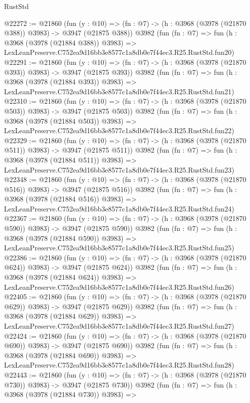 \begin{lexlean}{RustStd}
\begin{coremodule}
@22272 := @21860
    (fun (y : @10) => (fn : @7) -> (h : @3968 (@3978 (@21870 @388)) @3983) -> @3947 (@21875 @388))
    @3982
    (fun (fn : @7) =>
    fun (h : @3968 (@3978 (@21884 @388)) @3983) =>
    LexLeanPreserve.C752ea9d16bb3e8577c1a8db0e7f44ec3.R25.RustStd.fun20)
@22291 := @21860
    (fun (y : @10) => (fn : @7) -> (h : @3968 (@3978 (@21870 @393)) @3983) -> @3947 (@21875 @393))
    @3982
    (fun (fn : @7) =>
    fun (h : @3968 (@3978 (@21884 @393)) @3983) =>
    LexLeanPreserve.C752ea9d16bb3e8577c1a8db0e7f44ec3.R25.RustStd.fun21)
@22310 := @21860
    (fun (y : @10) => (fn : @7) -> (h : @3968 (@3978 (@21870 @503)) @3983) -> @3947 (@21875 @503))
    @3982
    (fun (fn : @7) =>
    fun (h : @3968 (@3978 (@21884 @503)) @3983) =>
    LexLeanPreserve.C752ea9d16bb3e8577c1a8db0e7f44ec3.R25.RustStd.fun22)
@22329 := @21860
    (fun (y : @10) => (fn : @7) -> (h : @3968 (@3978 (@21870 @511)) @3983) -> @3947 (@21875 @511))
    @3982
    (fun (fn : @7) =>
    fun (h : @3968 (@3978 (@21884 @511)) @3983) =>
    LexLeanPreserve.C752ea9d16bb3e8577c1a8db0e7f44ec3.R25.RustStd.fun23)
@22348 := @21860
    (fun (y : @10) => (fn : @7) -> (h : @3968 (@3978 (@21870 @516)) @3983) -> @3947 (@21875 @516))
    @3982
    (fun (fn : @7) =>
    fun (h : @3968 (@3978 (@21884 @516)) @3983) =>
    LexLeanPreserve.C752ea9d16bb3e8577c1a8db0e7f44ec3.R25.RustStd.fun24)
@22367 := @21860
    (fun (y : @10) => (fn : @7) -> (h : @3968 (@3978 (@21870 @590)) @3983) -> @3947 (@21875 @590))
    @3982
    (fun (fn : @7) =>
    fun (h : @3968 (@3978 (@21884 @590)) @3983) =>
    LexLeanPreserve.C752ea9d16bb3e8577c1a8db0e7f44ec3.R25.RustStd.fun25)
@22386 := @21860
    (fun (y : @10) => (fn : @7) -> (h : @3968 (@3978 (@21870 @624)) @3983) -> @3947 (@21875 @624))
    @3982
    (fun (fn : @7) =>
    fun (h : @3968 (@3978 (@21884 @624)) @3983) =>
    LexLeanPreserve.C752ea9d16bb3e8577c1a8db0e7f44ec3.R25.RustStd.fun26)
@22405 := @21860
    (fun (y : @10) => (fn : @7) -> (h : @3968 (@3978 (@21870 @629)) @3983) -> @3947 (@21875 @629))
    @3982
    (fun (fn : @7) =>
    fun (h : @3968 (@3978 (@21884 @629)) @3983) =>
    LexLeanPreserve.C752ea9d16bb3e8577c1a8db0e7f44ec3.R25.RustStd.fun27)
@22424 := @21860
    (fun (y : @10) => (fn : @7) -> (h : @3968 (@3978 (@21870 @690)) @3983) -> @3947 (@21875 @690))
    @3982
    (fun (fn : @7) =>
    fun (h : @3968 (@3978 (@21884 @690)) @3983) =>
    LexLeanPreserve.C752ea9d16bb3e8577c1a8db0e7f44ec3.R25.RustStd.fun28)
@22443 := @21860
    (fun (y : @10) => (fn : @7) -> (h : @3968 (@3978 (@21870 @730)) @3983) -> @3947 (@21875 @730))
    @3982
    (fun (fn : @7) =>
    fun (h : @3968 (@3978 (@21884 @730)) @3983) =>

\end{coremodule}
\end{lexlean}
